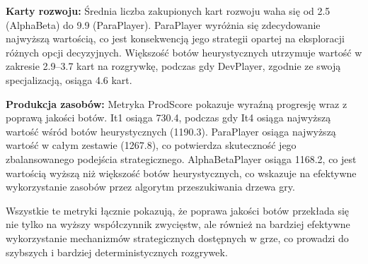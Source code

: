 \textbf{Karty rozwoju:} Średnia liczba zakupionych kart rozwoju waha się od 2.5 (AlphaBeta) do 9.9 (ParaPlayer). ParaPlayer wyróżnia się zdecydowanie najwyższą wartością, co jest konsekwencją jego strategii opartej na eksploracji różnych opcji decyzyjnych. Większość botów heurystycznych utrzymuje wartość w zakresie 2.9--3.7 kart na rozgrywkę, podczas gdy DevPlayer, zgodnie ze swoją specjalizacją, osiąga 4.6 kart.

\textbf{Produkcja zasobów:} Metryka ProdScore pokazuje wyraźną progresję wraz z poprawą jakości botów. It1 osiąga 730.4, podczas gdy It4 osiąga najwyższą wartość wśród botów heurystycznych (1190.3). ParaPlayer osiąga najwyższą wartość w całym zestawie (1267.8), co potwierdza skuteczność jego zbalansowanego podejścia strategicznego. AlphaBetaPlayer osiąga 1168.2, co jest wartością wyższą niż większość botów heurystycznych, co wskazuje na efektywne wykorzystanie zasobów przez algorytm przeszukiwania drzewa gry.

Wszystkie te metryki łącznie pokazują, że poprawa jakości botów przekłada się nie tylko na wyższy współczynnik zwycięstw, ale również na bardziej efektywne wykorzystanie mechanizmów strategicznych dostępnych w grze, co prowadzi do szybszych i bardziej deterministycznych rozgrywek.

